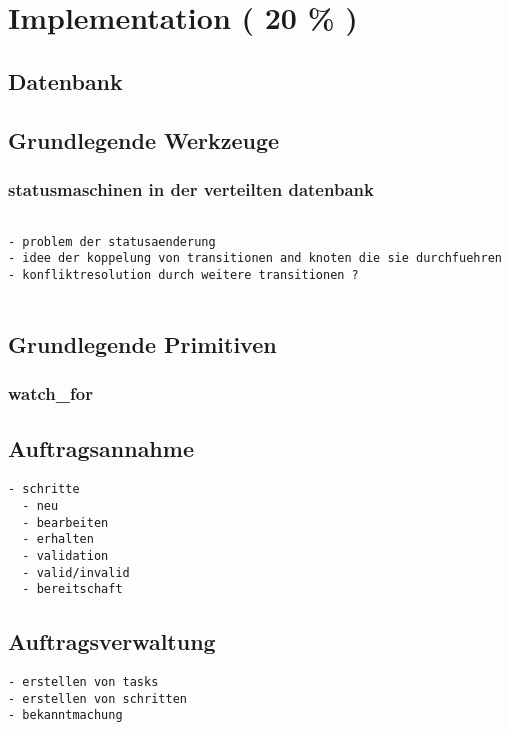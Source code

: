 \chapter{Implementation ( 20 \% ) }
\section{Datenbank}
\section{Grundlegende Werkzeuge}
\subsection{statusmaschinen in der verteilten datenbank}

\begin{verbatim}

- problem der statusaenderung
- idee der koppelung von transitionen and knoten die sie durchfuehren
- konfliktresolution durch weitere transitionen ?


\end{verbatim}
\section{Grundlegende Primitiven}

\subsection{watch\_for}




\section{Auftragsannahme}

\begin{verbatim}
- schritte
  - neu
  - bearbeiten
  - erhalten
  - validation
  - valid/invalid
  - bereitschaft
\end{verbatim}

\section{Auftragsverwaltung}

\begin{verbatim}
- erstellen von tasks
- erstellen von schritten
- bekanntmachung
\end{verbatim}

